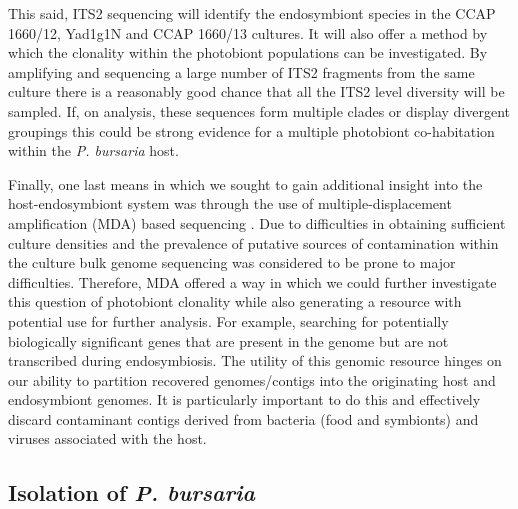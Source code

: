 This said, ITS2 sequencing will identify the endosymbiont species in
the CCAP 1660/12, Yad1g1N and CCAP 1660/13 cultures. It will also offer a
method by which the clonality within the
photobiont populations can be investigated.  
By amplifying and sequencing a large number of 
ITS2 fragments from the same culture there is a reasonably
good chance that all the ITS2 level diversity will be sampled. 
If, on analysis, these sequences form multiple clades or 
display divergent groupings this could be strong evidence
for a multiple photobiont co-habitation within the \textit{P. bursaria}
host.  


Finally, one last means in which we sought to
gain additional insight into the host-endosymbiont
system was through the use of multiple-displacement amplification (MDA)
based sequencing \citep{Lasken2007}.  
Due to difficulties in obtaining sufficient
culture densities and the prevalence of putative sources of contamination
within the culture bulk genome sequencing was considered to be prone to 
major difficulties.  Therefore, MDA offered a way in which 
we could further investigate this question of photobiont clonality
while also generating a resource with potential use for further analysis.
For example, searching for potentially biologically significant genes
that are 
present in the genome but are not transcribed during endosymbiosis.
The utility of this genomic resource hinges on our ability to 
partition recovered genomes/contigs into the originating host
and endosymbiont genomes.  It is particularly important to do this
and effectively discard contaminant contigs derived from 
bacteria (food and symbionts) and viruses associated with the host. 



%

\subsection{Isolation of \textit{P. bursaria}}

